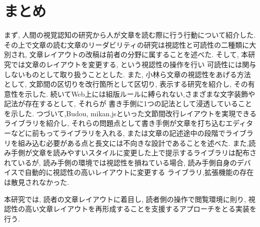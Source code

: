 \section{まとめ}
まず, 人間の視覚認知の研究から人が文章を読む際に行う行動について紹介した.
その上で文章の読む文章のリーダビリティの研究は視認性と可読性の二種類に大別され, 
文章レイアウトの改稿は前者の分野に属することを述べた.
そして, 本研究では文章のレイアウトを変更する, という視認性の操作を行い
可読性には関与しないものとして取り扱うこととした.
また, 小林ら文章の視認性をあげる方法として, 文節間の区切りを改行箇所として区切り,
表示する研究を紹介し, その有意性を示した.
続いてWeb上には組版ルールに縛られない,さまざまな文字装飾や記法が存在するとして, それらが
書き手側に1つの記法として浸透していることを示した.
つづいて,Budou, mikan.jsといった文節間改行レイアウトを実現できるライブラリを紹介し, 
それらの問題点として書き手側が文章を打ち込むエディターなどに前もってライブラリを入れる, 
または文章の記述途中の段階でライブラリを組み込む必要がある点と長文には不向きな設計であることを述べた.
また,読み手側が文章を読みやすいスタイルに変更した上で提示するライブラリは配布されているが,
読み手側の環境では視認性を損ねている場合, 読み手側自身のデバイスで自動的に視認性の高いレイアウトに変更する
ライブラリ,拡張機能の存在は散見されなかった.

本研究では, 読者の文章レイアウトに着目し, 読者側の操作で閲覧環境に則り,
視認性の高い文章レイアウトを再形成することを支援するアプローチをとる実装を行う.